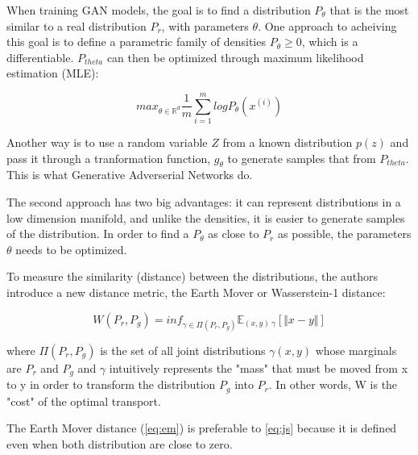 
When training GAN models, the goal is to find a distribution $P_{\theta}$ that is the most similar to a real distribution $P_{r}$, with parameters $\theta$. One approach to acheiving this goal is to define a parametric family of densities $P_{\theta} \geq 0$, which is a differentiable. $P_{theta}$ can then be optimized through maximum likelihood estimation (MLE):

\begin{equation}
	\label{eq:mle}
	max_{\theta\in \mathbb{R}^{d}} \frac{1}{m} \sum_{i=1}^{m} log P_{\theta}(x^{(i)})
\end{equation}

Another way is to use a random variable $Z$ from a known distribution $p(z)$ and pass it through a tranformation function, $g_{\theta}$ to generate samples that from $P_{theta}$. This is what Generative Adverserial Networks do.

The second approach has two big advantages: it can represent distributions in a low dimension manifold, and unlike the densities, it is easier to generate samples of the distribution. In order to find a $P_{\theta}$ as close to $P_{r}$ as possible, the parameters $\theta$ needs to be optimized. 

To measure the similarity (distance) between the distributions, the authors introduce a new distance metric, the Earth Mover or Wasserstein-1 distance:

\begin{equation}
	\label{eq:em}
	W(P_{r}, P_{g}) = inf_{\gamma \in \Pi(P_{r},P_{g})} \mathbb{E}_{(x,y)~\gamma}[\Vert x - y \Vert]
\end{equation}

where $\Pi(P_{r}, P_{g})$ is the set of all joint distributions $\gamma(x,y)$ whose marginals are $P_{r}$ and $P_{g}$ and $\gamma$ intuitively represents the "mass" that must be moved from x to y in order to transform the distribution  $P_{g}$ into $P_{r}$. In other words, W is the "cost" of the optimal transport.

The Earth Mover distance (\ref{eq:em}) is preferable to \ref{eq:js} because it is defined even when both distribution are close to zero. 


